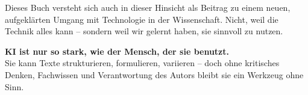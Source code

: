 Dieses Buch versteht sich auch in dieser Hinsicht als Beitrag zu einem neuen, aufgeklärten Umgang mit Technologie in der Wissenschaft. Nicht, weil die Technik alles kann – sondern weil wir gelernt haben, sie sinnvoll zu nutzen.

\vspace{1em}
\begin{tcolorbox}[didaktikbox, title=Leitgedanke]
	\label{box:leitgedanke}
	\small
	\textbf{KI ist nur so stark, wie der Mensch, der sie benutzt.}\\
	Sie kann Texte strukturieren, formulieren, variieren – 
	doch ohne kritisches Denken, Fachwissen und Verantwortung 
	des Autors bleibt sie ein Werkzeug ohne Sinn.
\end{tcolorbox}
